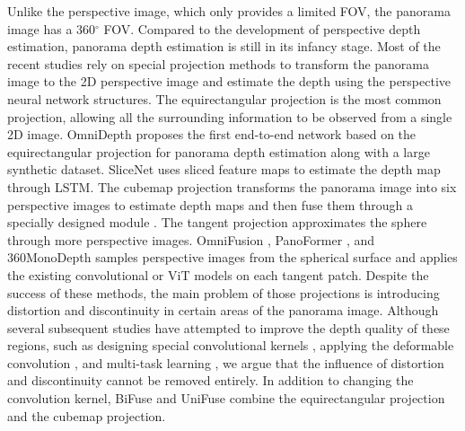 Unlike the perspective image, which only provides a limited FOV, the panorama image has a 360$^\circ$ FOV. 
Compared to the development of perspective depth estimation, panorama depth estimation is still in its infancy stage. 
Most of the recent studies \cite{zioulis2018omnidepth,wang2020bifuse,sun2021hohonet,shen2022panoformer,junayed2022himode,shen2022neural} rely on special projection methods to transform the panorama image to the 2D perspective image and estimate the depth using the perspective neural network structures.
The equirectangular projection is the most common projection, allowing all the surrounding information to be observed from a single 2D image. 
OmniDepth \cite{zioulis2018omnidepth} proposes the first end-to-end network based on the equirectangular projection for panorama depth estimation along with a large synthetic dataset. 
SliceNet \cite{pintore2021slicenet} uses sliced feature maps to estimate the depth map through LSTM. 
The cubemap projection transforms the panorama image into six perspective images to estimate depth maps and then fuse them through a specially designed module \cite{cheng2018cube,wang2020bifuse}.
The tangent projection approximates the sphere through more perspective images.
OmniFusion \cite{li2022omnifusion}, PanoFormer \cite{shen2022panoformer}, and 360MonoDepth \cite{rey2022360monodepth} samples perspective images from the spherical surface \cite{eder2020tangent} and applies the existing convolutional or ViT models on each tangent patch. 
Despite the success of these methods, the main problem of those projections is introducing distortion and discontinuity in certain areas of the panorama image. 
Although several subsequent studies have attempted to improve the depth quality of these regions, such as designing special convolutional kernels \cite{yu2017flat2sphere, de2018eliminating,su2019kernel,eder2019mapped,tateno2018distortion,wang2020360sd,cheng2020omnidirectional}, applying the deformable convolution \cite{chen2021distortion,fernandez2020corners}, and multi-task learning \cite{eder2019pano,zeng2020joint,jin2020geometric}, we argue that the influence of distortion and discontinuity cannot be removed entirely.
In addition to changing the convolution kernel, BiFuse \cite{wang2020bifuse} and UniFuse \cite{jiang2021unifuse} combine the equirectangular projection and the cubemap projection.


